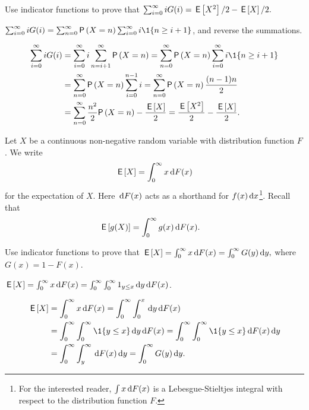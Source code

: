 \begin{exercise}\label{ex:66}
 Use indicator functions to prove that
$\sum_{i=0}^\infty i G(i) =  \,\mathsf{E}\left[X^2\right]/2 - \,\mathsf{E}\left[X\right]/2.$
    \begin{hint}
$\sum_{i=0}^\infty i G(i) = \sum_{n=0}^\infty \P{X=n} \sum_{i=0}^\infty i \1{n\geq i+1}$,
and reverse the summations.
    \end{hint}
\begin{solution}
\begin{align*}
\sum_{i=0}^\infty i G(i)
&= \sum_{i=0}^\infty i \sum_{n=i+1}^\infty \P{X=n} = \sum_{n=0}^\infty \P{X=n} \sum_{i=0}^\infty i \1{n\geq i+1} \\
&= \sum_{n=0}^\infty \P{X=n} \sum_{i=0}^{n-1}i  = \sum_{n=0}^\infty \P{X=n} \frac{(n-1)n}{2} \\
&= \sum_{n=0}^\infty  \frac{n^2}{2} \P{X=n} - \frac{\E X}{2}
= \frac{\E{X^2}}{2} - \frac{\E X}{2}.
\end{align*}
\end{solution}
\end{exercise}



Let $X$ be a continuous non-negative random variable with distribution function $F$.  We write 
\begin{equation*}
  \,\mathsf{E}\left[X\right] = \int_0^\infty x \,\text{d}F(x)
\end{equation*}
for the expectation of $X$. Here $\,\text{d}F(x)$ acts as a shorthand for $f(x) \,\text{d}x$\footnote{For the interested reader, $\int x \,\text{d}F(x)$ is a Lebesgue-Stieltjes integral with respect to the distribution function $F$.}. Recall that
\begin{align*}
\,\mathsf{E}\left[g(X)\right] &= \int_0^\infty g(x) \,\text{d}F(x).
\end{align*}



\begin{exercise}%
 Use indicator functions to prove that 
$   \,\mathsf{E}\left[X\right] = \int_0^\infty x \,\text{d}F(x)  = \int_0^\infty G(y) \,\text{d}y,$
where $G(x) = 1 - F(x)$. 
\begin{hint}
$\,\mathsf{E}\left[X\right] = \int_0^\infty x \,\text{d}F(x)  = \int_0^\infty \int_0^\infty 1_{y\leq x} \,\text{d}y \,\text{d}F(x)$.
\end{hint}
\begin{solution}
\begin{equation*}
  \begin{split}
    \E{X} &= \int_0^\infty x \d F(x)  = \int_0^\infty \int_0^x \d y \d F(x) \\
    & = \int_0^\infty \int_0^\infty \1{y\leq x} \d y \d F(x)   = \int_0^\infty \int_0^\infty \1{y\leq x} \d F(x) \d y\\
    & = \int_0^\infty \int_y^\infty \d F(x) \d y = \int_0^\infty G(y) \d y.
  \end{split}
\end{equation*}
\end{solution}
\end{exercise}

